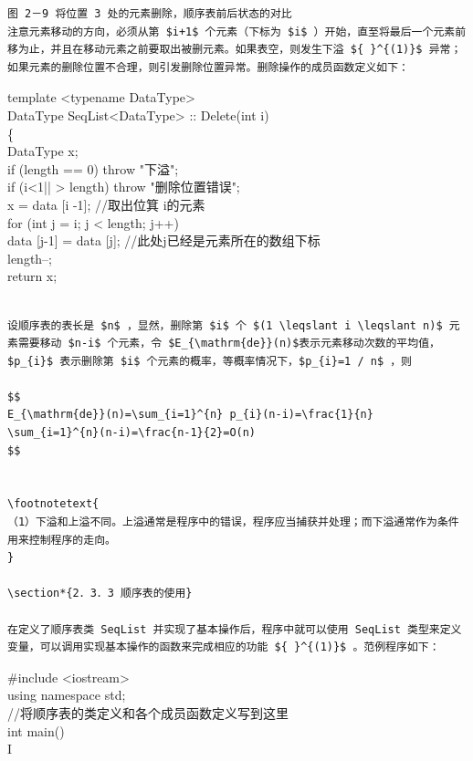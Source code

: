 \documentclass[10pt]{article}
\let\svthefootnote\thefootnote
\newcommand\blfootnotetext[1]{%
  \let\thefootnote\relax\footnote{#1}%
  \addtocounter{footnote}{-1}%
  \let\thefootnote\svthefootnote%
}
\let\svfootnotetext\footnotetext
\renewcommand\footnotetext[2][?]{%
  \if\relax#1\relax%
    \ifnum\value{footnote}=0\blfootnotetext{#2}\else\svfootnotetext{#2}\fi%
  \else%
    \if?#1\ifnum\value{footnote}=0\blfootnotetext{#2}\else\svfootnotetext{#2}\fi%
    \else\svfootnotetext[#1]{#2}\fi%
  \fi
}
\begin{document}
\begin{verbatim}
图 2－9 将位置 3 处的元素删除，顺序表前后状态的对比
注意元素移动的方向，必须从第 $i+1$ 个元素（下标为 $i$ ）开始，直至将最后一个元素前移为止，并且在移动元素之前要取出被删元素。如果表空，则发生下溢 ${ }^{(1)}$ 异常；如果元素的删除位置不合理，则引发删除位置异常。删除操作的成员函数定义如下：
\end{verbatim}

template <typename DataType>\\
DataType SeqList<DataType> :: Delete(int i)\\
\{\\
DataType x;\\
if (length == 0) throw "下溢";\\
if (i<1|| > length) throw "删除位置错误";\\[0pt]
x = data [i -1]; //取出位箕 i的元素\\
for (int j = i; j < length; j++)\\[0pt]
data [j-1] = data [j]; //此处j已经是元素所在的数组下标\\
length--;\\
return x;

\begin{verbatim}

设顺序表的表长是 $n$ ，显然，删除第 $i$ 个 $(1 \leqslant i \leqslant n)$ 元素需要移动 $n-i$ 个元素，令 $E_{\mathrm{de}}(n)$表示元素移动次数的平均值，$p_{i}$ 表示删除第 $i$ 个元素的概率，等概率情况下，$p_{i}=1 / n$ ，则

$$
E_{\mathrm{de}}(n)=\sum_{i=1}^{n} p_{i}(n-i)=\frac{1}{n} \sum_{i=1}^{n}(n-i)=\frac{n-1}{2}=O(n)
$$


\footnotetext{
（1）下溢和上溢不同。上溢通常是程序中的错误，程序应当捕获并处理；而下溢通常作为条件用来控制程序的走向。
}

\section*{2．3．3 顺序表的使用}

在定义了顺序表类 SeqList 并实现了基本操作后，程序中就可以使用 SeqList 类型来定义变量，可以调用实现基本操作的函数来完成相应的功能 ${ }^{(1)}$ 。范例程序如下：
\end{verbatim}

\#include <iostream>\\
using namespace std;\\
//将顺序表的类定义和各个成员函数定义写到这里\\
int main()\\
I
\end{document}

